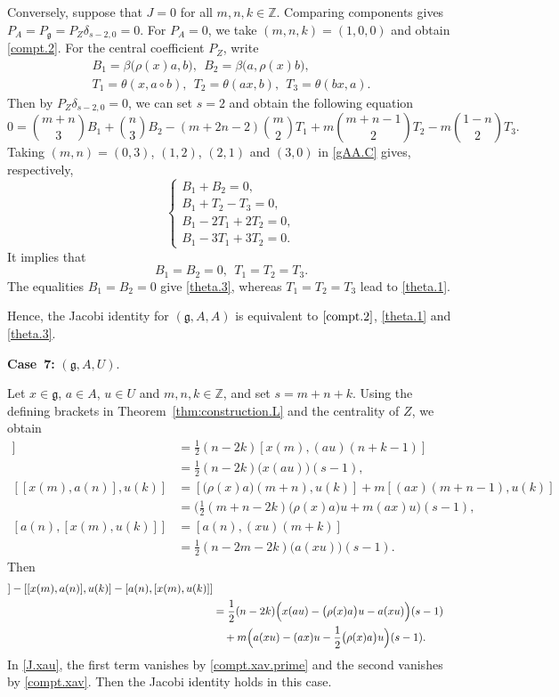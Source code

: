 \documentclass[12pt]{article}
\numberwithin{equation}{section}
\theoremstyle{definition}
\theoremstyle{plain}
\newcommand{\bZ}{\ensuremath{\mathbb{Z}}}
\newcommand{\afCase}[1]{\textbf{Case~#1:}}
\newcommand{\fg}{\mathfrak{g}}
\begin{document}
Conversely, suppose that $J=0$ for all $m,n,k\in\bZ$. Comparing components gives $P_A=P_\fg=P_Z\delta_{s-2,0}=0$. For $P_A=0$, we take $(m,n,k)=(1,0,0)$ and obtain \eqref{compt.2}. For the central coefficient $P_Z$, write
\begin{gather*}
    B_1=\beta\big(\rho(x)a,b\big),\ \ B_2=\beta\big(a,\rho(x)b\big),\\
    T_1=\theta(x,a\circ b),\ \ T_2=\theta(ax,b),\ \ T_3=\theta(bx,a).
\end{gather*}
Then by $P_Z\delta_{s-2,0}=0$, we can set $s=2$ and obtain the following equation
\begin{equation}\label{gAA.C}
    0=\binom{m+n}{3}B_1+\binom{n}{3}B_2-(m+2n-2)\binom{m}{2}T_1+m\binom{m+n-1}{2}T_2-m\binom{1-n}{2}T_3.
\end{equation}
Taking $(m,n)=(0,3)$, $(1,2)$, $(2,1)$ and $(3,0)$ in \eqref{gAA.C} gives, respectively, 
\begin{equation*}
    \begin{cases}
        B_1+B_2=0,\\
        B_1+T_2-T_3=0,\\
        B_1-2T_1+2T_2=0,\\
        B_1-3T_1+3T_2=0.
    \end{cases}
\end{equation*}
It implies that
\begin{equation*}
    B_1=B_2=0,\ \ T_1=T_2=T_3.
\end{equation*}
The equalities $B_1=B_2=0$ give \eqref{theta.3}, whereas $T_1=T_2=T_3$ lead to \eqref{theta.1}.

Hence, the Jacobi identity for $(\fg,A,A)$ is equivalent to $\eqref{compt.2}$, \eqref{theta.1} and \eqref{theta.3}.


\afCase{7} $(\fg,A,U)$.

Let $x\in\fg$, $a\in A$, $u\in U$ and $m,n,k\in\bZ$, and set $s=m+n+k$. Using the defining brackets in Theorem~\ref{thm:construction.L} and the centrality of $Z$, we obtain
\begin{align*}
    [x(m),[a(n),u(k)]]&=\frac{1}{2}(n-2k)[x(m),(au)(n+k-1)]\\
    &=\frac{1}{2}(n-2k)\big(x(au)\big)(s-1),\\
    [[x(m),a(n)],u(k)]&=[\big(\rho(x)a\big)(m+n),u(k)]+m[(ax)(m+n-1),u(k)]\\
    &=\Big(\frac{1}{2}(m+n-2k)\big(\rho(x)a\big)u+m(ax)u\Big)(s-1),\\
    [a(n),[x(m),u(k)]]&=[a(n),(xu)(m+k)]\\
    &=\frac{1}{2}(n-2m-2k)\big(a(xu)\big)(s-1).
\end{align*}
Then
\begin{align}
    [x(m),[&a(n),u(k)]]-[[x(m),a(n)],u(k)]-[a(n),[x(m),u(k)]]\notag\\
    &=\frac{1}{2}(n-2k)\Big(x(au)-\big(\rho(x)a\big)u-a(xu)\Big)(s-1)\notag\\
    &\quad+m\Big(a(xu)-(ax)u-\frac{1}{2}\big(\rho(x)a\big)u\Big)(s-1).\label{J.xau}
\end{align}
In \eqref{J.xau}, the first term vanishes by \eqref{compt.xav.prime} and the second vanishes by \eqref{compt.xav}. Then the Jacobi identity holds in this case.
\end{document}
